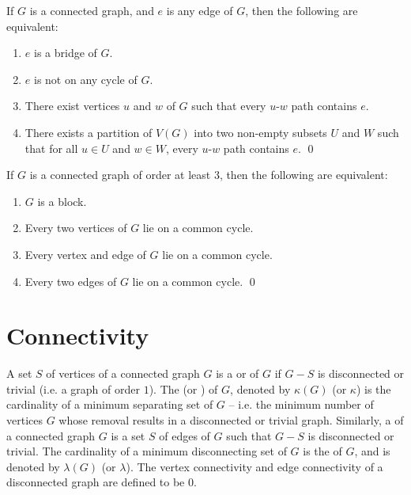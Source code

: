 \begin{Theorem}\label{thm:BridgeChar}
If $G$ is a connected graph, and $e$ is any edge of $G$, then the following are equivalent:
\begin{enumerate}[label=(\roman*)]
\item\label{it:BridgeChar1} $e$ is a bridge of $G$.
\item \label{it:BridgeChar2} $e$ is not on any cycle of $G$.
\item\label{it:BridgeChar3} There exist vertices $u$ and $w$ of $G$ such that every $u$-$w$ path contains $e$.
\item\label{it:BridgeChar4} There exists a partition of $V(G)$ into two non-empty subsets $U$ and $W$ such that for all $u \in U$ and $w \in W$, every $u$-$w$ path contains $e$. \qed
\end{enumerate}
\end{Theorem}

\begin{Theorem}\label{thm:BlockChar}
If $G$ is a connected graph of order at least $3$, then the following are equivalent:
\begin{enumerate}[label=(\roman*)]
\item\label{it:BlockChar1} $G$ is a block.
\item \label{it:BlockChar2} Every two vertices of $G$ lie on a common cycle.
\item\label{it:BlockChar3} Every vertex and edge of $G$ lie on a common cycle.
\item\label{it:BlockChar4} Every two edges of $G$ lie on a common cycle. \qed
\end{enumerate}
\end{Theorem}


\section{Connectivity}\label{sec:Connectivity}

A set $S$ of vertices of a connected graph $G$ is a  or  of $G$ if $G - S$ is disconnected or trivial (i.e. a graph of order $1$). The  (or ) of $G$, denoted by $\kappa(G)$ (or $\kappa$) is the cardinality of a minimum separating set of $G$ -- i.e. the minimum number of vertices $G$ whose removal results in a disconnected or trivial graph. Similarly, a  of a connected graph $G$ is a set $S$ of edges of $G$ such that $G - S$ is disconnected or trivial. The cardinality of a minimum disconnecting set of $G$ is the  of $G$, and is denoted by $\lambda(G)$ (or $\lambda$). The vertex connectivity and edge connectivity of a disconnected graph are defined to be $0$.

